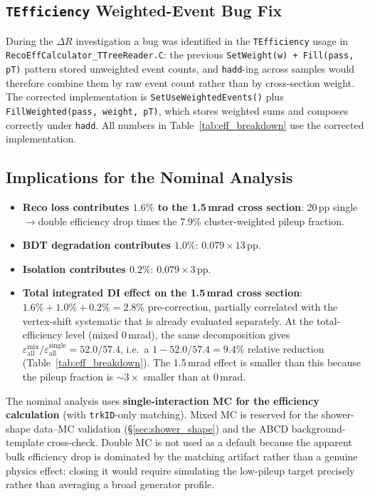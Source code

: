 \documentclass[11pt,a4paper]{article}
\newcommand{\DR}{\ensuremath{\Delta R}\xspace}
\begin{document}
\subsection{\texttt{TEfficiency} Weighted-Event Bug Fix}
\label{subsec:tefficiency_fix}

During the $\DR$ investigation a bug was identified in the
\texttt{TEfficiency} usage in \texttt{RecoEffCalculator\_TTreeReader.C}:
the previous \texttt{SetWeight(w) + Fill(pass, pT)} pattern stored
unweighted event counts, and \texttt{hadd}-ing across samples would
therefore combine them by raw event count rather than by cross-section
weight. The corrected implementation is
\texttt{SetUseWeightedEvents()} plus \texttt{FillWeighted(pass, weight,
pT)}, which stores weighted sums and composes correctly under
\texttt{hadd}. All numbers in Table~\ref{tab:eff_breakdown} use the
corrected implementation.

\subsection{Implications for the Nominal Analysis}
\label{subsec:eff_implications}

\begin{itemize}
\item \textbf{Reco loss contributes $1.6\%$ to the 1.5\,mrad
  cross section}: 20\,pp single$\to$double efficiency drop times
  the 7.9\% cluster-weighted pileup fraction.
\item \textbf{BDT degradation contributes $1.0\%$}:
  $0.079 \times 13\,\text{pp}$.
\item \textbf{Isolation contributes $0.2\%$}:
  $0.079 \times 3\,\text{pp}$.
\item \textbf{Total integrated DI effect on the 1.5\,mrad cross
  section}: $1.6\%+1.0\%+0.2\%=\mathbf{2.8\%}$ pre-correction,
  partially correlated with the vertex-shift systematic that is
  already evaluated separately. At the total-efficiency level
  (mixed 0\,mrad), the same decomposition gives
  $\varepsilon_\mathrm{all}^\mathrm{mix}/\varepsilon_\mathrm{all}^\mathrm{single}
  = 52.0/57.4$, i.e.\ a $1-52.0/57.4=\mathbf{9.4\%}$ relative
  reduction (Table~\ref{tab:eff_breakdown}). The 1.5\,mrad effect
  is smaller than this because the pileup fraction is $\sim\!3\times$
  smaller than at 0\,mrad.
\end{itemize}

The nominal analysis uses \textbf{single-interaction MC for the
efficiency calculation} (with \texttt{trkID}-only matching). Mixed MC
is reserved for the shower-shape data--MC validation
(\S\ref{sec:shower_shape}) and the ABCD background-template
cross-check. Double MC is not used as a default because the apparent
bulk efficiency drop is dominated by the matching artifact rather than
a genuine physics effect: closing it would require simulating the
low-pileup target precisely rather than averaging a broad
generator profile.
\end{document}
